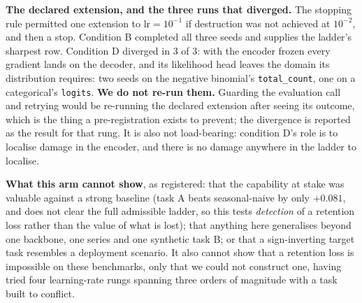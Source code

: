 \textbf{The declared extension, and the three runs that diverged.} The stopping
rule permitted one extension to $\text{lr}{=}10^{-1}$ if destruction was not
achieved at $10^{-2}$, and then a stop.  Condition B completed all three seeds
and supplies the ladder's sharpest row.  Condition D diverged in 3 of 3: with the
encoder frozen every gradient lands on the decoder, and its likelihood head
leaves the domain its distribution requires: two seeds on the negative
binomial's \texttt{total\_count}, one on a categorical's \texttt{logits}.
\textbf{We do not re-run them.}  Guarding the evaluation call and retrying would
be re-running the declared extension after seeing its outcome, which is the thing
a pre-registration exists to prevent; the divergence is reported as the result
for that rung.  It is also not load-bearing: condition D's role is to localise
damage in the encoder, and there is no damage anywhere in the ladder to localise.

\textbf{What this arm cannot show}, as registered: that the capability at stake
was valuable against a strong baseline (task A beats seasonal-naive by only
$+0.081$, and does not clear the full admissible ladder, so this tests
\emph{detection} of a retention loss rather than the value of what is lost); that
anything here generalises beyond one backbone, one series and one synthetic task
B; or that a sign-inverting target task resembles a deployment scenario.  It also
cannot show that a retention loss is impossible on these benchmarks, only that
we could not construct one, having tried four learning-rate rungs spanning three
orders of magnitude with a task built to conflict.

\begin{table}[!htbp]
\centering
\small
\caption{\textbf{The pre-registered positive control: 21 runs, no destruction.}
Task A is Moirai-Small/ETTh2 $h{=}192$; task B is the anti-persistent synthetic
series, fixed by SHA-256 before any run.  Retention on task A is
$100(\text{MSE}_A(\theta_\text{FT}) - \text{MSE}_A(\theta_\text{ZS}))/\text{MSE}_A(\theta_\text{ZS})$,
\emph{positive is worse}; the registered destruction threshold is $+50\%$ in a
majority of seeds.  CKA is on task A's inputs; $\pm$ is the SEM over 3 seeds;
$^{\dagger}$ marks the declared ladder extension; the evaluator noise floor is
$0.48$~pp.}
\label{tab:poscontrol}

\end{table}
